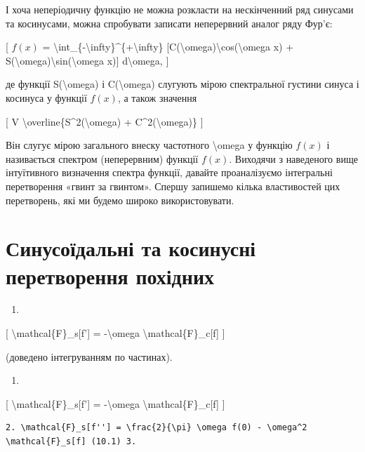 \documentclass[
]{article}
\providecommand{\tightlist}{%
  \setlength{\itemsep}{0pt}\setlength{\parskip}{0pt}}
\begin{document}
{{І хоча неперіодичну функцію не можна розкласти на нескінченний ряд
синусами та косинусами, можна спробувати записати неперервний аналог
ряду Фур'є:

{[} \(f(x)\) =
\textbackslash int\_\{-\textbackslash infty\}\^{}\{+\textbackslash infty\}
{[}C(\textbackslash omega)\textbackslash cos(\textbackslash omega x) +
S(\textbackslash omega)\textbackslash sin(\textbackslash omega x){]}
d\textbackslash omega, {]}

де функції S(\textbackslash omega) і C(\textbackslash omega) слугують
мірою спектральної густини синуса і косинуса у функції \(f(x)\), а також
значення

{[} V \textbackslash overline\{S\^{}2(\textbackslash omega) +
C\^{}2(\textbackslash omega)\} {]}

Він слугує мірою загального внеску частотного \textbackslash omega у
функцію \(f(x)\) і називається спектром (неперервним) функції \(f(x)\).
Виходячи з наведеного вище інтуїтивного визначення спектра функції,
давайте проаналізуємо інтегральні перетворення «гвинт за гвинтом».
Спершу запишемо кілька властивостей цих перетворень, які ми будемо
широко використовувати.

\section{Синусоїдальні та косинусні перетворення
похідних}\label{ux441ux438ux43dux443ux441ux43eux457ux434ux430ux43bux44cux43dux456-ux442ux430-ux43aux43eux441ux438ux43dux443ux441ux43dux456-ux43fux435ux440ux435ux442ux432ux43eux440ux435ux43dux43dux44f-ux43fux43eux445ux456ux434ux43dux438ux445}

\begin{enumerate}
\def\labelenumi{\arabic{enumi}.}
\tightlist
\item
\end{enumerate}

{[} \textbackslash mathcal\{F\}\_s{[}f'{]} = -\textbackslash omega
\textbackslash mathcal\{F\}\_c{[}f{]} {]}

(доведено інтегруванням по частинах).

\begin{enumerate}
\def\labelenumi{\arabic{enumi}.}
\tightlist
\item
\end{enumerate}

{[} \textbackslash mathcal\{F\}\_s{[}f'{]} = -\textbackslash omega
\textbackslash mathcal\{F\}\_c{[}f{]} {]}

\begin{verbatim}
2. \mathcal{F}_s[f''] = \frac{2}{\pi} \omega f(0) - \omega^2 \mathcal{F}_s[f] (10.1) 3.
\end{verbatim}

}}
\end{document}
